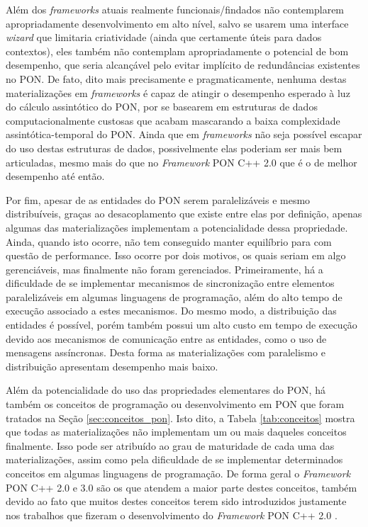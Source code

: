 Além dos \textit{frameworks} atuais realmente funcionais/findados não
contemplarem apropriadamente desenvolvimento em alto nível, salvo se usarem uma
interface \textit{wizard} que limitaria criatividade (ainda que certamente úteis
para dados contextos), eles também não contemplam apropriadamente o potencial de
bom desempenho, que seria alcançável pelo evitar implícito de redundâncias
existentes no PON. De fato, dito mais precisamente e pragmaticamente, nenhuma
destas materializações em \textit{frameworks} é capaz de atingir o desempenho
esperado à luz do cálculo assintótico do PON, por se basearem em estruturas de
dados computacionalmente custosas que acabam mascarando a baixa complexidade
assintótica-temporal do PON. Ainda que em \textit{frameworks} não seja possível
escapar do uso destas estruturas de dados, possivelmente elas poderiam ser
mais bem articuladas, mesmo mais do que no \textit{Framework} PON C++ 2.0 que é
o de melhor desempenho até então.

Por fim, apesar de as entidades do PON serem paralelizáveis e mesmo
distribuíveis, graças ao desacoplamento que existe entre elas por definição,
apenas algumas das materializações implementam a potencialidade dessa
propriedade. Ainda, quando isto ocorre, não tem conseguido manter equilíbrio
para com questão de performance. Isso ocorre por dois motivos, os quais seriam
em algo gerenciáveis, mas finalmente não foram gerenciados. Primeiramente, há a
dificuldade de se implementar mecanismos de sincronização entre elementos
paralelizáveis em algumas linguagens de programação, além do alto tempo de
execução associado a estes mecanismos. Do mesmo modo, a distribuição das
entidades é possível, porém também possui um alto custo em tempo de execução
devido aos mecanismos de comunicação entre as entidades, como o uso de mensagens
assíncronas. Desta forma as materializações com paralelismo e distribuição
apresentam desempenho mais baixo.

Além da potencialidade do uso das propriedades elementares do PON, há também os
conceitos de programação ou desenvolvimento em PON que foram tratados na Seção
\ref{sec:conceitos_pon}. Isto dito, a Tabela \ref{tab:conceitos} mostra que
todas as materializações não implementam um ou mais daqueles conceitos
finalmente. Isso pode ser atribuído ao grau de maturidade de cada uma das
materializações, assim como pela dificuldade de se implementar determinados
conceitos em algumas linguagens de programação. De forma geral o
\textit{Framework} PON C++ 2.0 e 3.0 são os que atendem a maior parte destes
conceitos, também devido ao fato que muitos destes conceitos terem sido
introduzidos justamente nos trabalhos que fizeram o desenvolvimento do
\textit{Framework} PON C++ 2.0 \cite{msc_Ronszcka_2012,msc_valenca_2012}.

